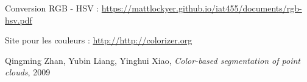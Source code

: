 \documentclass[12pt,titlepage,french]{article}
\begin{document}
\begin{thebibliography}{3}

 Conversion RGB - HSV : \newline
\url{https://mattlockyer.github.io/iat455/documents/rgb-hsv.pdf}

 Site pour les couleurs : \newline
\url{http://http://colorizer.org}

 Qingming Zhan, Yubin Liang, Yinghui Xiao, \textit{Color-based segmentation of point clouds}, 2009

\end{thebibliography}
\end{document}
